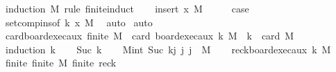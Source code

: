 \begin{isabellebody}
%
\endisadelimproof
%
\isatagproof
{}\isamarkupfalse%
\ {\isacharparenleft}{\kern0pt}induction\ M\ rule{\isacharcolon}{\kern0pt}\ finite{\isacharunderscore}{\kern0pt}induct{\isacharparenright}{\kern0pt}\isanewline
\ \ \isamarkupfalse%
\ {\isacharparenleft}{\kern0pt}insert\ x\ M{\isacharparenright}{\kern0pt}\isanewline
\ \ \isamarkupfalse%
\ \isamarkupfalse%
\ {\isacharquery}{\kern0pt}case\ \isamarkupfalse%
\ set{\isacharunderscore}{\kern0pt}comp{\isacharunderscore}{\kern0pt}ins{\isacharbrackleft}{\kern0pt}of\ k\ x\ M{\isacharbrackright}{\kern0pt}\ \isamarkupfalse%
\ auto\isanewline
{}\isamarkupfalse%
\ auto%
\endisatagproof
{\isafoldproof}%
%
\isadelimproof
\isanewline
%
\endisadelimproof
\isanewline
{}\isamarkupfalse%
\ card{\isacharunderscore}{\kern0pt}board{\isacharunderscore}{\kern0pt}exec{\isacharunderscore}{\kern0pt}aux{\isacharcolon}{\kern0pt}\ {\isachardoublequoteopen}finite\ M\ {\isasymLongrightarrow}\ card\ {\isacharparenleft}{\kern0pt}board{\isacharunderscore}{\kern0pt}exec{\isacharunderscore}{\kern0pt}aux\ k\ M{\isacharparenright}{\kern0pt}\ {\isacharequal}{\kern0pt}\ k\ {\isacharasterisk}{\kern0pt}\ card\ M{\isachardoublequoteclose}\isanewline
%
\isadelimproof
%
\endisadelimproof
%
\isatagproof
{}\isamarkupfalse%
\ {\isacharparenleft}{\kern0pt}induction\ k{\isacharparenright}{\kern0pt}\isanewline
\ \ \isamarkupfalse%
\ {\isacharparenleft}{\kern0pt}Suc\ k{\isacharparenright}{\kern0pt}\isanewline
\ \ \isamarkupfalse%
\ {\isacharquery}{\kern0pt}M{\isacharprime}{\kern0pt}{\isacharequal}{\kern0pt}{\isachardoublequoteopen}{\isacharbraceleft}{\kern0pt}{\isacharparenleft}{\kern0pt}int\ {\isacharparenleft}{\kern0pt}Suc\ k{\isacharparenright}{\kern0pt}{\isacharcomma}{\kern0pt}j{\isacharparenright}{\kern0pt}\ {\isacharbar}{\kern0pt}j{\isachardot}{\kern0pt}\ j\ {\isasymin}\ M{\isacharbraceright}{\kern0pt}{\isachardoublequoteclose}\isanewline
\ \ \isamarkupfalse%
\ {\isacharquery}{\kern0pt}rec{\isacharunderscore}{\kern0pt}k{\isacharequal}{\kern0pt}{\isachardoublequoteopen}board{\isacharunderscore}{\kern0pt}exec{\isacharunderscore}{\kern0pt}aux\ k\ M{\isachardoublequoteclose}\isanewline
\isanewline
\ \ \isamarkupfalse%
\ finite{\isacharcolon}{\kern0pt}\ {\isachardoublequoteopen}finite\ {\isacharquery}{\kern0pt}M{\isacharprime}{\kern0pt}{\isachardoublequoteclose}\ {\isachardoublequoteopen}finite\ {\isacharquery}{\kern0pt}rec{\isacharunderscore}{\kern0pt}k{\isachardoublequoteclose}\isanewline

\end{isabellebody}
